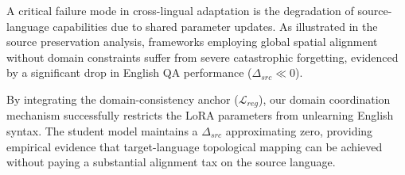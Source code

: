 \documentclass[11pt]{article}
\begin{document}
\begin{table}[t]
\centering
\small
{}
\caption{Analysis of source preservation ($\Delta_{src}$) on English SQuAD 2.0 (in-domain, i.e.\ the Stage-1 training distribution), alongside held-out English XQuAD-en and MLQA-en (the exact English counterparts of the XQuAD-vi/MLQA-vi transfer targets used elsewhere in this paper). $\Delta_{src} = F1_{post\text{-}align} - F1_{pre\text{-}align}$.}
\label{tab:source_preservation}
\end{table}

A critical failure mode in cross-lingual adaptation is the degradation of source-language capabilities due to shared parameter updates. As illustrated in the source preservation analysis, frameworks employing global spatial alignment without domain constraints suffer from severe catastrophic forgetting, evidenced by a significant drop in English QA performance ($\Delta_{src} \ll 0$). 

By integrating the domain-consistency anchor ($\mathcal{L}_{reg}$), our domain coordination mechanism successfully restricts the LoRA parameters from unlearning English syntax. The student model maintains a $\Delta_{src}$ approximating zero, providing empirical evidence that target-language topological mapping can be achieved without paying a substantial alignment tax on the source language.
\end{document}
